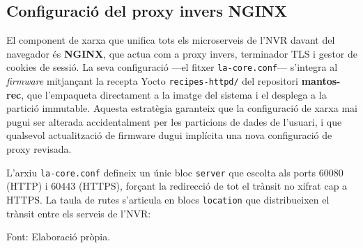 \subsection{Configuració del proxy invers NGINX}
\label{sec:nginx_config}

El component de xarxa que unifica tots els microserveis de l'NVR davant del navegador és \textbf{NGINX}, que actua com a proxy invers, terminador TLS i gestor de cookies de sessió. La seva configuració —el fitxer \texttt{la-core.conf}— s'integra al \textit{firmware} mitjançant la recepta Yocto \texttt{recipes-httpd/} del repositori \textbf{mantos-rec}, que l'empaqueta directament a la imatge del sistema i el desplega a la partició immutable. Aquesta estratègia garanteix que la configuració de xarxa mai pugui ser alterada accidentalment per les particions de dades de l'usuari, i que qualsevol actualització de firmware dugui implícita una nova configuració de proxy revisada.

L'arxiu \texttt{la-core.conf} defineix un únic bloc \texttt{server} que escolta als ports 60080 (HTTP) i 60443 (HTTPS), forçant la redirecció de tot el trànsit no xifrat cap a HTTPS. La taula de rutes s'articula en blocs \texttt{location} que distribueixen el trànsit entre els serveis de l'NVR:

\clearpage
\begin{table}[htbp]
  \centering
  \caption{Taula de rutes del proxy invers NGINX de l'NVR (\texttt{la-core.conf}).}
  \label{tab:nginx_routes}
  \par\smallskip
  \small Font: Elaboració pròpia.
\end{table}

